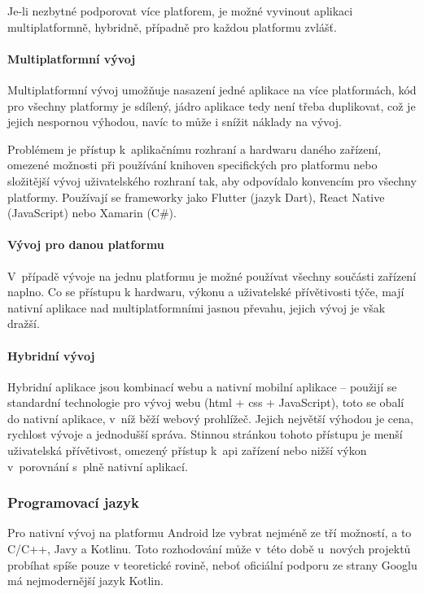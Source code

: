 \documentclass[twoside]{ctuthesis}
\begin{document}
Je-li nezbytné podporovat více platforem, je možné vyvinout aplikaci multiplatformně, hybridně, případně pro každou platformu zvlášť.

\paragraph{Multiplatformní vývoj}
Multiplatformní vývoj umožňuje nasazení jedné aplikace na více platformách, kód pro všechny platformy je sdílený, jádro aplikace tedy není třeba duplikovat, což je jejich nespornou výhodou, navíc to může i snížit náklady na vývoj.

Problémem je přístup k~aplikačnímu rozhraní a hardwaru daného zařízení, omezené možnosti při používání knihoven specifických pro platformu nebo složitější vývoj uživatelského rozhraní tak, aby odpovídalo konvencím pro všechny platformy. \cite{manchanda2020where}   Používají se frameworky jako Flutter (jazyk Dart), React Native (JavaScript) nebo Xamarin (C\#).

\paragraph{Vývoj pro danou platformu}
V~případě vývoje na jednu platformu je možné používat všechny součásti zařízení naplno. Co se přístupu k hardwaru, výkonu a uživatelské přívětivosti týče, mají nativní aplikace nad multiplatformními jasnou převahu, jejich vývoj je však dražší. \cite{dennis2018native}

\paragraph{Hybridní vývoj}
Hybridní aplikace jsou kombinací webu a nativní mobilní aplikace – použijí se standardní technologie pro vývoj webu (\acrshort{html} + \acrshort{css} + JavaScript), toto se obalí do nativní aplikace, v~níž běží webový prohlížeč. Jejich největší výhodou je cena, rychlost vývoje a jednodušší správa. Stinnou stránkou tohoto přístupu je menší uživatelská přívětivost, omezený přístup k~\acrshort{api} zařízení nebo nižší výkon v~porovnání s~plně nativní aplikací. \cite{design2020ultimate}


\subsubsection{Programovací jazyk}
Pro nativní vývoj na platformu Android lze vybrat nejméně ze tří možností, a to C/C++, Javy a Kotlinu. Toto rozhodování může v~této době u~nových projektů probíhat spíše pouze v teoretické rovině, neboť oficiální podporu ze strany Googlu má nejmodernější jazyk Kotlin.
\end{document}

